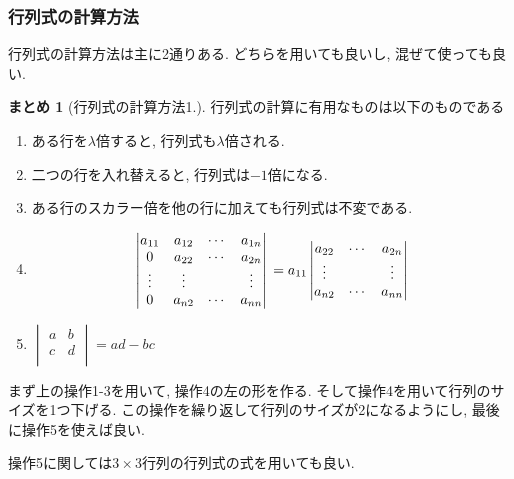 \documentclass[dvipdfmx,a4paper,11pt]{article}
\theoremstyle{definition}
\newtheorem{suma}[thm]{まとめ}
\begin{document}
 \subsubsection{行列式の計算方法}
 
 行列式の計算方法は主に2通りある. 
 どちらを用いても良いし, 混ぜて使っても良い. 
 
  \begin{tcolorbox}[
    colback = white,
    colframe = green!35!black,
    fonttitle = \bfseries,
    breakable = true]
    \begin{suma}[行列式の計算方法1.]
    行列式の計算に有用なものは以下のものである
\begin{enumerate}[label=\textbf{操作}\arabic*.]
    \setlength{\parskip}{0cm} 
  \setlength{\itemsep}{0cm}
 \item  ある行を$\lambda$倍すると, 行列式も$\lambda$倍される.
 \item 二つの行を入れ替えると, 行列式は$-1$倍になる. 
 \item ある行のスカラー倍を他の行に加えても行列式は不変である. 
 \item 
 $$
\begin{vmatrix}
a_{11} & a_{12} & \cdots & a_{1n} \\
0 & a_{22} & \cdots & a_{2n} \\
\vdots & \vdots & & \vdots \\
0& a_{n2} & \cdots & a_{nn}
\end{vmatrix}\\
=
a_{11} 
\begin{vmatrix}
a_{22} & \cdots & a_{2n} \\
\vdots & & \vdots \\
a_{n2} & \cdots & a_{nn}
\end{vmatrix}
 $$
 \item $\begin{vmatrix}
a& b\\
c&d\\
 \end{vmatrix} 
=ad-bc$
 \end{enumerate}
 まず上の操作1-3を用いて, 操作4の左の形を作る. そして操作4を用いて行列のサイズを1つ下げる. この操作を繰り返して行列のサイズが2になるようにし, 最後に操作5を使えば良い.  
 \end{suma}
  \end{tcolorbox}
  操作5に関しては$3 \times 3$行列の行列式の式を用いても良い. 
\end{document}
